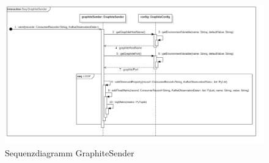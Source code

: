 {{{{{\begin{figure}[!hbp]
	\centering
	\includegraphics[width=\linewidth]{images/graphite/GraphiteSenderSequenceDiagram.png}
	\caption{Sequenzdiagramm GraphiteSender}
\end{figure}
\newpage

}}}}}
